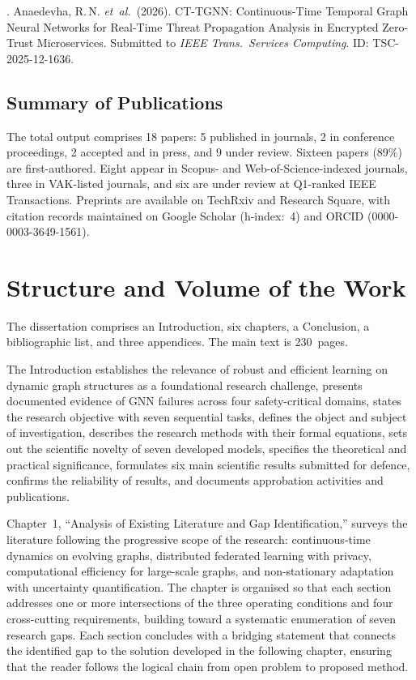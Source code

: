 . Anaedevha, R.\,N. \textit{et~al.}\ (2026). CT-TGNN: Continuous-Time Temporal Graph Neural Networks for Real-Time Threat Propagation Analysis in Encrypted Zero-Trust Microservices. Submitted to \textit{IEEE Trans.\ Services Computing}. ID: TSC-2025-12-1636.

\subsection*{Summary of Publications}

The total output comprises 18 papers: 5 published in journals, 2 in conference proceedings, 2 accepted and in press, and 9 under review. Sixteen papers (89\%) are first-authored. Eight appear in Scopus- and Web-of-Science-indexed journals, three in VAK-listed journals, and six are under review at Q1-ranked IEEE Transactions. Preprints are available on TechRxiv and Research Square, with citation records maintained on Google Scholar (h-index:~4) and ORCID (0000-0003-3649-1561).

\section*{Structure and Volume of the Work}

The dissertation comprises an Introduction, six chapters, a Conclusion, a bibliographic list, and three appendices. The main text is 230~pages.

The Introduction establishes the relevance of robust and efficient learning on dynamic graph structures as a foundational research challenge, presents documented evidence of GNN failures across four safety-critical domains, states the research objective with seven sequential tasks, defines the object and subject of investigation, describes the research methods with their formal equations, sets out the scientific novelty of seven developed models, specifies the theoretical and practical significance, formulates six main scientific results submitted for defence, confirms the reliability of results, and documents approbation activities and publications.

Chapter~1, ``Analysis of Existing Literature and Gap Identification,'' surveys the literature following the progressive scope of the research: continuous-time dynamics on evolving graphs, distributed federated learning with privacy, computational efficiency for large-scale graphs, and non-stationary adaptation with uncertainty quantification. The chapter is organised so that each section addresses one or more intersections of the three operating conditions and four cross-cutting requirements, building toward a systematic enumeration of seven research gaps. Each section concludes with a bridging statement that connects the identified gap to the solution developed in the following chapter, ensuring that the reader follows the logical chain from open problem to proposed method.

